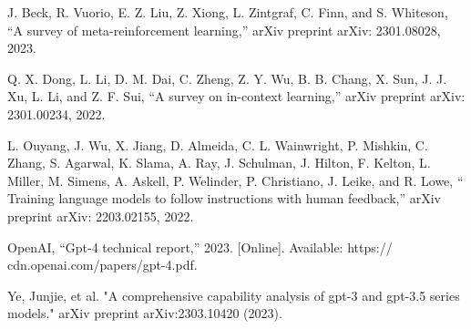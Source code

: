 \documentclass[conference]{IEEEtran}
\begin{document}
\begin{thebibliography}{00}
 J. Beck, R. Vuorio, E. Z. Liu, Z. Xiong, L. Zintgraf, C. Finn, and S. Whiteson, “A survey of meta-reinforcement learning,” arXiv preprint arXiv: 2301.08028, 2023.


 Q. X. Dong, L. Li, D. M. Dai, C. Zheng, Z. Y. Wu, B. B. Chang, X. Sun, J. J. Xu, L. Li, and Z. F. Sui, “A survey on in-context learning,” arXiv preprint arXiv: 2301.00234, 2022.

 L. Ouyang, J. Wu, X. Jiang, D. Almeida, C. L. Wainwright, P. Mishkin, C. Zhang, S. Agarwal, K. Slama, A. Ray, J. Schulman, J. Hilton, F. Kelton, L. Miller, M. Simens, A. Askell, P. Welinder, P. Christiano, J. Leike, and R. Lowe, “ Training language models to follow instructions with human feedback,” arXiv preprint arXiv: 2203.02155, 2022.


 OpenAI, “Gpt-4 technical report,” 2023. [Online]. Available: https:// cdn.openai.com/papers/gpt-4.pdf.


 Ye, Junjie, et al. "A comprehensive capability analysis of gpt-3 and gpt-3.5 series models." arXiv preprint arXiv:2303.10420 (2023).









\end{thebibliography}
\end{document}
